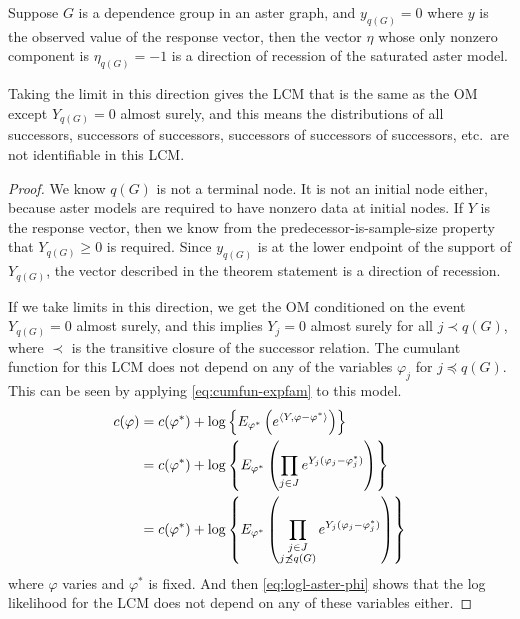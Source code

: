 \begin{theorem} \label{th:dor-predecessor-zero}
Suppose $G$ is a dependence group in an aster graph, and $y_{q(G)} = 0$
where $y$ is the observed value of the response vector,  then the
vector $\eta$ whose only nonzero component is $\eta_{q(G)} = -1$ is a
direction of recession of the saturated aster model.

Taking the limit in this direction gives the LCM that is the same as the
OM except $Y_{q(G)} = 0$ almost surely, and this means the distributions
of all successors, successors of successors, successors of successors of
successors, etc.\ are not identifiable in this LCM.
\end{theorem}
\begin{proof}
We know $q(G)$ is not a terminal node.  It is not an initial node either,
because aster models are required to have nonzero data at initial nodes.
If $Y$ is the response vector, then we know from
the predecessor-is-sample-size property that $Y_{q(G)} \ge 0$ is required.
Since $y_{q(G)}$ is at the lower endpoint of the support of $Y_{q(G)}$,
the vector described in the theorem statement is a direction of recession.

If we take limits in this direction, we get the OM conditioned on the event
$Y_{q(G)} = 0$ almost surely, and this implies $Y_j = 0$ almost surely for
all $j \prec q(G)$, where $\prec$ is the transitive closure of the successor
relation.  The cumulant function for this LCM does not depend on any
of the variables $\varphi_j$ for $j \preceq q(G)$.
This can be seen by applying \eqref{eq:cumfun-expfam} to this model.
\begin{align*}
   c(\varphi)
   & =
   c(\varphi^*) + \log\left\{ E_{\varphi^*} \left(
   e^{\langle Y, \varphi - \varphi^* \rangle} \right) \right\}
   \\
   & =
   c(\varphi^*) + \log\left\{ E_{\varphi^*} \left(
   \prod_{j \in J} e^{Y_j (\varphi_j - \varphi^*_j)}
   \right) \right\}
   \\
   & =
   c(\varphi^*) + \log\left\{ E_{\varphi^*} \left(
   \prod_{\substack{j \in J \\ j \not\preceq q(G)}}
   e^{Y_j (\varphi_j - \varphi^*_j)}
   \right) \right\}
\end{align*}
where $\varphi$ varies and $\varphi^*$ is fixed.
And then \eqref{eq:logl-aster-phi} shows that the log likelihood for the
LCM does not depend on any of these variables either.
\end{proof}

